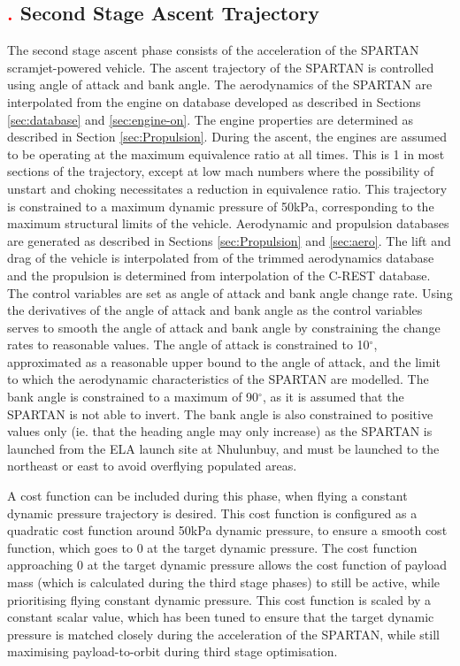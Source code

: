 \subsection{\textcolor{red}{.} Second Stage Ascent Trajectory}
The second stage ascent phase consists of the acceleration of the SPARTAN scramjet-powered vehicle. 
The ascent trajectory of the SPARTAN is controlled using angle of attack and bank angle. The aerodynamics of the SPARTAN are interpolated from the engine on database developed as described in Sections \ref{sec:database} and \ref{sec:engine-on}. The engine properties are determined as described in Section \ref{sec:Propulsion}.
During the ascent, the engines are assumed to be operating at the maximum equivalence ratio at all times. This is 1 in most sections of the trajectory, except at low mach numbers where the possibility of unstart and choking necessitates a reduction in equivalence ratio. This trajectory is constrained to a maximum dynamic pressure of 50kPa, corresponding to the maximum structural limits of the vehicle. Aerodynamic and propulsion databases are generated as described in Sections \ref{sec:Propulsion} and \ref{sec:aero}. The lift and drag of the vehicle is interpolated from of the trimmed aerodynamics database and the propulsion is determined from interpolation of the C-REST database. 
The control variables are set as angle of attack and bank angle change rate. Using the derivatives of the angle of attack and bank angle as the control variables serves to smooth the angle of attack and bank angle by constraining the change rates to reasonable values. The angle of attack is constrained to 10$^\circ$, approximated as a reasonable upper bound to the angle of attack, and the limit to which the aerodynamic characteristics of the SPARTAN are modelled. The bank angle is constrained to a maximum of 90$^\circ$, as it is assumed that the SPARTAN is not able to invert. The bank angle is also constrained to positive values only (ie. that the heading angle may only increase) as the SPARTAN is launched from the ELA launch site at Nhulunbuy, and must be launched to the northeast or east to avoid overflying populated areas. 

A cost function can be included during this phase, when flying a constant dynamic pressure trajectory is desired. This cost function is configured as a quadratic cost function around 50kPa dynamic pressure, to ensure a smooth cost function, which goes to 0 at the target dynamic pressure. The cost function approaching 0 at the target dynamic pressure allows the cost function of payload mass (which is calculated during the third stage phases) to still be active, while prioritising flying constant dynamic pressure. This cost function is scaled by a constant scalar value, which has been tuned to ensure that the target dynamic pressure is matched closely during the acceleration of the SPARTAN, while still maximising payload-to-orbit during third stage optimisation. 



